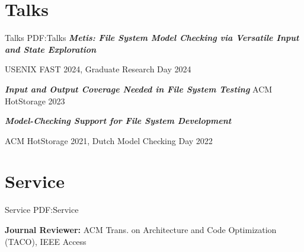 \documentclass[a4paper,10pt,oneside]{article}
\begin{document}
\begin{body}



\section
{Talks}
{Talks}
{PDF:Talks}
\BulletItem
\textbf{\textit{Metis: File System Model Checking via Versatile Input and State Exploration}}

\SubBulletItem
USENIX FAST 2024, Graduate Research Day 2024 %


\GapNoBreak

\BulletItem
\textbf{\textit{Input and Output Coverage Needed in File System Testing}}
\SubBulletItem
ACM HotStorage 2023 %

\GapNoBreak

\BulletItem
\textbf{\textit{Model-Checking Support for File System Development}}

\SubBulletItem
ACM HotStorage 2021, Dutch Model Checking Day 2022




\section
{Service}
{Service}
{PDF:Service}


\textbf{Journal Reviewer:}
ACM Trans. on Architecture and Code Optimization (TACO), IEEE Access



\end{body}
\end{document}
